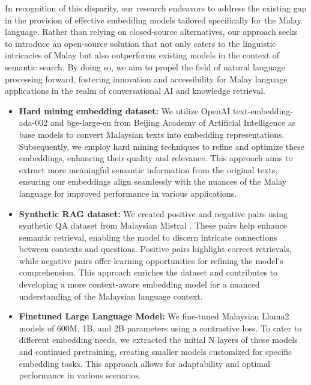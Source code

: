 \documentclass[preprint]{article}
\begin{document}
In recognition of this disparity, our research endeavors to address the existing gap in the provision of effective embedding models tailored specifically for the Malay language. Rather than relying on closed-source alternatives, our approach seeks to introduce an open-source solution that not only caters to the linguistic intricacies of Malay but also outperforms existing models in the context of semantic search. By doing so, we aim to propel the field of natural language processing forward, fostering innovation and accessibility for Malay language applications in the realm of conversational AI and knowledge retrieval.

\begin{itemize}
  \item \textbf{Hard mining embedding dataset:} We utilize OpenAI text-embedding-ada-002 and bge-large-en \cite{bge_embedding} from Beijing Academy of Artificial Intelligence as base models to convert Malaysian texts into embedding representations. Subsequently, we employ hard mining techniques to refine and optimize these embeddings, enhancing their quality and relevance. This approach aims to extract more meaningful semantic information from the original texts, ensuring our embeddings align seamlessly with the nuances of the Malay language for improved performance in various applications.

  \item \textbf{Synthetic RAG dataset:} We created positive and negative pairs using synthetic QA dataset from Malaysian Mistral \cite{zolkepli2024large}. These pairs help enhance semantic retrieval, enabling the model to discern intricate connections between contexts and questions. Positive pairs highlight correct retrievals, while negative pairs offer learning opportunities for refining the model's comprehension. This approach enriches the dataset and contributes to developing a more context-aware embedding model for a nuanced understanding of the Malaysian language context.

  \item \textbf{Finetuned Large Language Model:} We fine-tuned Malaysian Llama2 models of 600M, 1B, and 2B parameters using a contrastive loss. To cater to different embedding needs, we extracted the initial N layers of these models and continued pretraining, creating smaller models customized for specific embedding tasks. This approach allows for adaptability and optimal performance in various scenarios.
\end{itemize}
\end{document}
